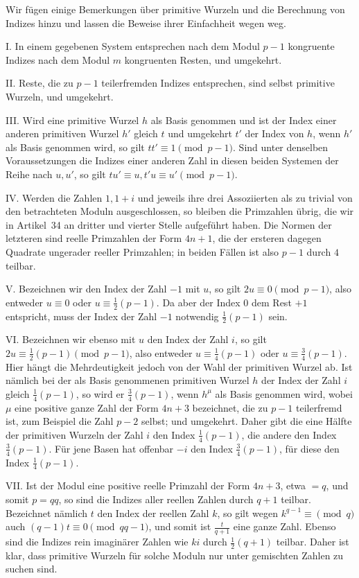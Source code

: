 Wir fügen einige Bemerkungen über primitive Wurzeln und die Berechnung von Indizes hinzu und lassen die Beweise ihrer Einfachheit wegen weg.

I. In einem gegebenen System entsprechen nach dem Modul $p-1$ kongruente Indizes nach dem Modul $m$ kongruenten Resten, und umgekehrt.

II. Reste, die zu $p-1$ teilerfremden Indizes entsprechen, sind selbst primitive Wurzeln, und umgekehrt.

III. Wird eine primitive Wurzel $h$ als Basis genommen und ist der Index einer anderen primitiven Wurzel $h'$ gleich $t$ und umgekehrt $t'$ der Index von $h$, wenn $h'$ als Basis genommen wird, so gilt $tt'\equiv1\pmod{p-1}$. Sind unter denselben Voraussetzungen die Indizes einer anderen Zahl in diesen beiden Systemen der Reihe nach $u,u'$, so gilt $tu'\equiv u,t'u\equiv u'\pmod{p-1}$.

IV. Werden die Zahlen $1,1+i$ und jeweils ihre drei Assoziierten als zu trivial von den betrachteten Moduln ausgeschlossen, so bleiben die Primzahlen übrig, die wir in Artikel~34 an dritter und vierter Stelle aufgeführt haben. Die Normen der letzteren sind reelle Primzahlen der Form $4n+1$, die der ersteren dagegen Quadrate ungerader reeller Primzahlen; in beiden Fällen ist also $p-1$ durch $4$ teilbar.

V. Bezeichnen wir den Index der Zahl $-1$ mit $u$, so gilt $2u\equiv0\pmod{p-1}$, also entweder $u\equiv0$ oder $u\equiv\frac12(p-1)$. Da aber der Index $0$ dem Rest $+1$ entspricht, muss der Index der Zahl $-1$ notwendig $\frac12(p-1)$ sein.

VI. Bezeichnen wir ebenso mit $u$ den Index der Zahl $i$, so gilt $2u\equiv\frac12(p-1)\pmod{p-1}$, also entweder $u\equiv\frac14(p-1)$ oder $u\equiv\frac34(p-1)$. Hier hängt die Mehrdeutigkeit jedoch von der Wahl der primitiven Wurzel ab. Ist nämlich bei der als Basis genommenen primitiven Wurzel $h$
%
der Index der Zahl $i$ gleich $\frac14(p-1)$, so wird er $\frac34(p-1)$, wenn $h^\mu$ als Basis genommen wird, wobei $\mu$ eine positive ganze Zahl der Form $4n+3$ bezeichnet, die zu $p-1$ teilerfremd ist, zum Beispiel die Zahl $p-2$ selbst; und umgekehrt. Daher gibt die eine Hälfte der primitiven Wurzeln der Zahl $i$ den Index $\frac14(p-1)$, die andere den Index $\frac34(p-1)$. Für jene Basen hat offenbar $-i$ den Index $\frac34(p-1)$, für diese den Index $\frac14(p-1)$.

VII. Ist der Modul eine positive reelle Primzahl der Form $4n+3$, etwa $=q$, und somit $p=qq$, so sind die Indizes aller reellen Zahlen durch $q+1$ teilbar. Bezeichnet nämlich $t$ den Index der reellen Zahl $k$, so gilt wegen $k^{q-1}\equiv\pmod q$ auch $(q-1)t\equiv0\pmod{qq-1}$, und somit ist $\frac{t}{q+1}$ eine ganze Zahl. Ebenso sind die Indizes rein imaginärer Zahlen wie $ki$ durch $\frac12(q+1)$ teilbar. Daher ist klar, dass primitive Wurzeln für solche Moduln nur unter gemischten Zahlen zu suchen sind.

